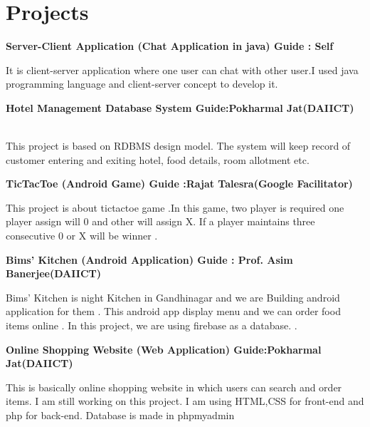 \documentclass{article}
\begin{document}
\section{Projects}


\begin{large}\textbf{Server-Client Application (Chat Application in java) \hspace*{3cm} Guide  : Self } \\
\end{large}
It is client-server application where one user can chat with other user.I used java programming language and client-server concept to develop it.

\begin{large}
\textbf{Hotel Management Database System \hspace*{3cm} Guide:Pokharmal      Jat(DAIICT) }
\end{large} \\
This project is based on RDBMS design model. The system
will keep record of customer entering and exiting hotel, food details, room allotment etc.

\begin{large}\textbf{TicTacToe (Android Game) \hspace*{3cm} Guide  :Rajat Talesra(Google Facilitator)}
\end{large}
This project is about tictactoe game .In this game, two player is required one player assign will 0  and other will assign X. If a player maintains three consecutive 0 or X will be winner  .\hspace*{5.5cm}


\begin{large}\textbf{Bims' Kitchen (Android Application)\hspace{3cm} Guide : Prof. Asim Banerjee(DAIICT)}\end{large} 
Bims' Kitchen is night Kitchen in Gandhinagar and we are Building android application for them . This android app display menu and we can order food items online . In this project, we are using firebase as a database.
.\hspace{13cm}  

\begin{large}\textbf{Online Shopping Website (Web Application) \hspace*{3cm}Guide:Pokharmal      Jat(DAIICT)}
\end{large}
This is basically online shopping website in which users can search and order items. I am still working on this project.
I am using HTML,CSS for front-end and php for back-end. Database is made in phpmyadmin\hspace*{5.5cm}
\end{document}
